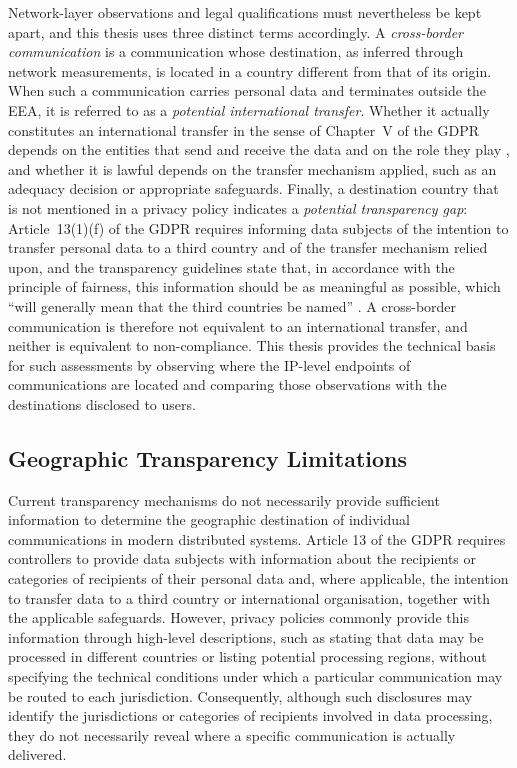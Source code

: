 Network-layer observations and legal qualifications must nevertheless be kept apart, and this thesis uses three distinct terms accordingly. A \textit{cross-border communication} is a communication whose destination, as inferred through network measurements, is located in a country different from that of its origin. When such a communication carries personal data and terminates outside the EEA, it is referred to as a \textit{potential international transfer}. Whether it actually constitutes an international transfer in the sense of Chapter~V of the GDPR depends on the entities that send and receive the data and on the role they play \cite{GuidelinesBoard}, and whether it is lawful depends on the transfer mechanism applied, such as an adequacy decision \cite{DataCountries} or appropriate safeguards. Finally, a destination country that is not mentioned in a privacy policy indicates a \textit{potential transparency gap}: Article~13(1)(f) of the GDPR requires informing data subjects of the intention to transfer personal data to a third country and of the transfer mechanism relied upon, and the transparency guidelines state that, in accordance with the principle of fairness, this information should be as meaningful as possible, which ``will generally mean that the third countries be named'' \cite{JUSTICEwp260rev.01}. A cross-border communication is therefore not equivalent to an international transfer, and neither is equivalent to non-compliance. This thesis provides the technical basis for such assessments by observing where the IP-level endpoints of communications are located and comparing those observations with the destinations disclosed to users. 

\subsection{Geographic Transparency Limitations}
\label{sc:background_privacy_transpanency}

Current transparency mechanisms do not necessarily provide sufficient information to determine the geographic destination of individual communications in modern distributed systems. Article 13 of the GDPR requires controllers to provide data subjects with information about the recipients or categories of recipients of their personal data and, where applicable, the intention to transfer data to a third country or international organisation, together with the applicable safeguards. However, privacy policies commonly provide this information through high-level descriptions, such as stating that data may be processed in different countries or listing potential processing regions, without specifying the technical conditions under which a particular communication may be routed to each jurisdiction. Consequently, although such disclosures may identify the jurisdictions or categories of recipients involved in data processing, they do not necessarily reveal where a specific communication is actually delivered.

